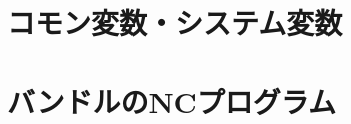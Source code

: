 \begin{appendices}
\chapter{コモン変数・システム変数}





%




\chapter{バンドルのNCプログラム}





%


\end{appendices}




%




